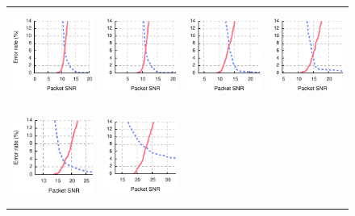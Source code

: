 \begin{figure}[p]
\begin{leftfullpage}
\begin{tabular}{cccc}
	\midrule
	\includegraphics[height=1.2in]{figures/delivery/goodbad/packet_snr_goodbad_8.pdf} &
	\includegraphics[height=1.2in]{figures/delivery/goodbad/packet_snr_goodbad_9.pdf} &
	\includegraphics[height=1.2in]{figures/delivery/goodbad/packet_snr_goodbad_10.pdf} &
	\includegraphics[height=1.2in]{figures/delivery/goodbad/packet_snr_goodbad_11.pdf} \\
	\includegraphics[height=1.2in]{figures/delivery/goodbad/packet_snr_goodbad_12.pdf} &
	\includegraphics[height=1.2in]{figures/delivery/goodbad/packet_snr_goodbad_13.pdf} &

\end{tabular}
\end{leftfullpage}
\end{figure}
